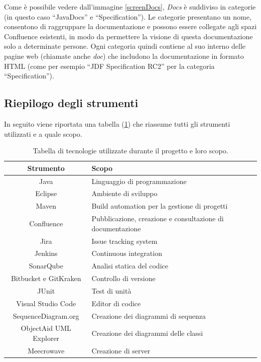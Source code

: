     Come è possibile vedere dall'immagine \ref{screenDocs}, \emph{Docs} è suddiviso in categorie (in questo caso ``JavaDocs'' e ``Specification'').
    Le categorie presentano un nome, consentono di raggruppare la documentazione e possono essere collegate agli spazi Confluence esistenti, in modo da permettere la visione di questa documentazione solo a determinate persone.
    Ogni categoria quindi contiene al suo interno delle pagine web (chiamate anche \emph{doc}) che includono la documentazione in formato HTML \cite{site:docs-plugin} (come per esempio ``JDF Specification RC2'' per la categoria ``Specification'').


    \subsection{Riepilogo degli strumenti}

    In seguito viene riportata una tabella (\ref{tabellaStrumenti}) che riassume tutti gli strumenti utilizzati e a quale scopo.

        \begin{table}[H]
            {\def\arraystretch{1.5}
            \begin{tabularx}{\textwidth}{cX}
                \rowcolor{beautyblue}
                \textbf{Strumento} &
                \textbf{Scopo} \\ \hline
                Java & Linguaggio di programmazione \\
                Eclipse & Ambiente di sviluppo \\
                Maven & Build automation per la gestione di progetti \\
                Confluence & Pubblicazione, creazione e consultazione di documentazione \\
                Jira & Issue tracking system \\
                Jenkins & Continuous integration \\
                SonarQube & Analisi statica del codice \\
                Bitbucket e GitKraken & Controllo di versione \\
                JUnit & Test di unità \\
                Visual Studio Code & Editor di codice \\
                SequenceDiagram.org & Creazione dei diagrammi di sequenza \\
                ObjectAid UML Explorer & Creazione dei diagrammi delle classi \\
                Meecrowave & Creazione di server \\
            \end{tabularx}} \\
        \caption{Tabella di tecnologie utilizzate durante il progetto e loro scopo.}
        \label{tabellaStrumenti}
        \end{table}


